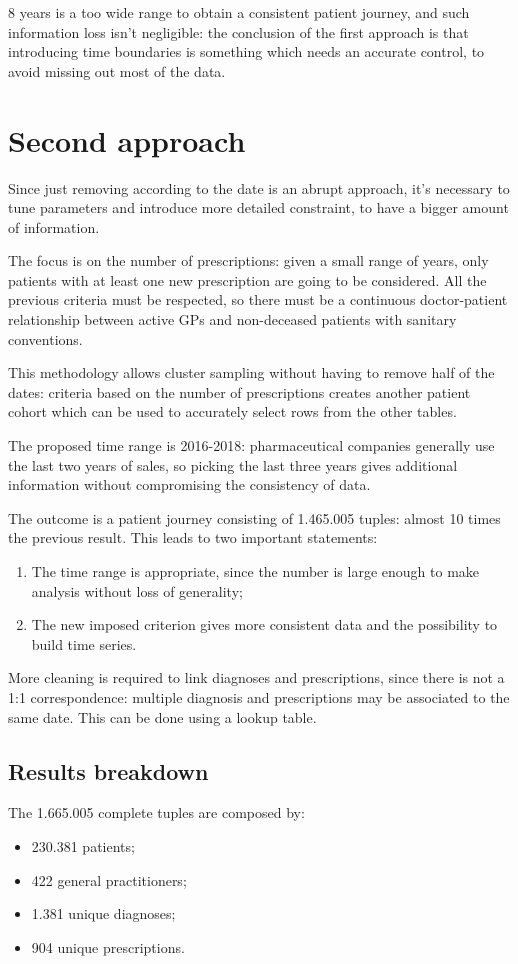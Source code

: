 8 years is a too wide range to obtain a consistent patient journey, and such information loss isn't negligible: the conclusion of the first approach is that introducing time boundaries is something which needs an accurate control, to avoid missing out most of the data.

\newpage
\section{Second approach}
Since just removing according to the date is an abrupt approach, it's necessary to tune parameters and introduce more detailed constraint, to have a bigger amount of information.

The focus is on the number of prescriptions: given a small range of years, only patients with at least one new prescription are going to be considered. All the previous criteria must be respected, so there must be a continuous doctor-patient relationship between active GPs and non-deceased patients with sanitary conventions.

This methodology allows cluster sampling without having to remove half of the dates: criteria based on the number of prescriptions creates another patient cohort which can be used to accurately select rows from the other tables.

The proposed time range is 2016-2018: pharmaceutical companies generally use the last two years of sales, so picking the last three years gives additional information without compromising the consistency of data.

The outcome is a patient journey consisting of 1.465.005 tuples: almost 10 times the previous result. This leads to two important statements:
\begin{enumerate}
	\item The time range is appropriate, since the number is large enough to make analysis without loss of generality;
	\item The new imposed criterion gives more consistent data and the possibility to build time series.
\end{enumerate}

More cleaning is required to link diagnoses and prescriptions, since there is not a 1:1 correspondence: multiple diagnosis and prescriptions may be associated to the same date. This can be done using a lookup table.

\subsection{Results breakdown}
The 1.665.005 complete tuples are composed by:
\begin{itemize}
	\item 230.381 patients;
	\item 422 general practitioners;
	\item 1.381 unique diagnoses;
	\item 904 unique prescriptions.
\end{itemize}

